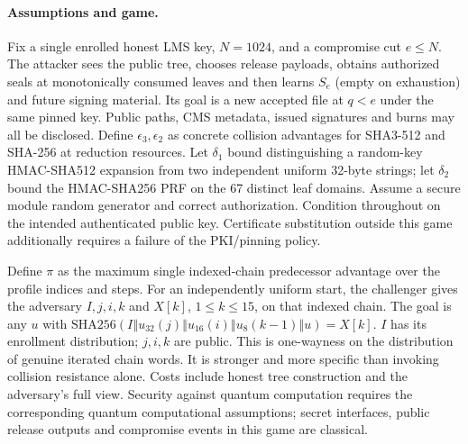 \documentclass[10pt,twocolumn,letterpaper]{article}
\newcommand{\cat}{\mathbin\Vert}
\begin{document}
\paragraph{Assumptions and game.}
Fix a single enrolled honest LMS key, $N=1024$, and a compromise cut $e\le N$. The attacker sees the public tree, chooses release payloads, obtains authorized seals at monotonically consumed leaves and then learns $S_e$ (empty on exhaustion) and future signing material. Its goal is a new accepted file at $q<e$ under the same pinned key. Public paths, CMS metadata, issued signatures and burns may all be disclosed. Define $\epsilon_3,\epsilon_2$ as concrete collision advantages for SHA3-512 and SHA-256 at reduction resources. Let $\delta_1$ bound distinguishing a random-key HMAC-SHA512 expansion from two independent uniform 32-byte strings; let $\delta_2$ bound the HMAC-SHA256 PRF on the 67 distinct leaf domains. Assume a secure module random generator and correct authorization. Condition throughout on the intended authenticated public key. Certificate substitution outside this game additionally requires a failure of the PKI/pinning policy.

Define $\pi$ as the maximum single indexed-chain predecessor advantage over the profile indices and steps. For an independently uniform start, the challenger gives the adversary $I,j,i,k$ and $X[k]$, $1\le k\le15$, on that indexed chain. The goal is any $u$ with $\mathrm{SHA256}(I\cat u_{32}(j)\cat u_{16}(i)\cat u_8(k-1)\cat u)=X[k]$. $I$ has its enrollment distribution; $j,i,k$ are public. This is one-wayness on the distribution of genuine iterated chain words. It is stronger and more specific than invoking collision resistance alone. Costs include honest tree construction and the adversary's full view. Security against quantum computation requires the corresponding quantum computational assumptions; secret interfaces, public release outputs and compromise events in this game are classical.
\end{document}
